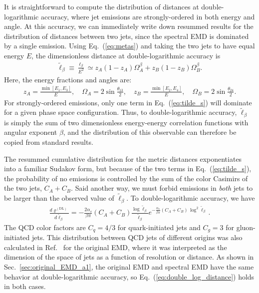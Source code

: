 \documentclass[letterpaper,11pt]{article}
\DeclareRobustCommand{\Sec}[1]{Sec.~\ref{#1}}
\DeclareRobustCommand{\Eq}[1]{Eq.~(\ref{#1})}
\DeclareRobustCommand{\InRef}[1]{Ref.~\cite{#1}}
\begin{document}
It is straightforward to compute the distribution of distances at double-logarithmic accuracy, where jet emissions are strongly-ordered in both energy and angle.
%
At this accuracy, we can immediately write down resummed results for the distribution of distances between two jets, since the spectral EMD is dominated by a single emission.
%
Using \Eq{eq:metas} and taking the two jets to have equal energy $E$, the dimensionless distance at double-logarithmic accuracy is
%
\begin{align}
\label{eq:tilde_s}
\tilde \ell_\beta \equiv \frac{\ell_\beta}{E^2} \simeq z_A (1-z_A) \Omega_{A}^\beta + z_B (1-z_B) \Omega_{B}^\beta.
\end{align}
%
Here, the energy fractions and angles are:
%
\begin{align}
z_A = \frac{\min[E_1,E_3]}{E}, \quad \Omega_A = 2 \sin \frac{\theta_{13}}{2}, \quad z_B= \frac{\min[E_2,E_4]}{E}, \quad \Omega_B = 2 \sin \frac{\theta_{24}}{2}.
\end{align}
%
For strongly-ordered emissions, only one term in \Eq{eq:tilde_s} will dominate for a given phase space configuration.
%
Thus, to double-logarithmic accuracy, $\tilde \ell_\beta$ is simply the sum of two dimensionless energy-energy correlation functions with angular exponent $\beta$, and the distribution of this observable can therefore be copied from standard results.



The resummed cumulative distribution for the metric distances exponentiates into a familiar Sudakov form, but because of the two terms in \Eq{eq:tilde_s}, the probability of no emissions is controlled by the sum of the color Casimirs of the two jets, $C_A+C_B$.
%
Said another way, we must forbid emissions in \emph{both} jets to be larger than the observed value of $\tilde \ell_\beta$.
%
To double-logarithmic accuracy, we have
%
\begin{align}
\label{eq:double_log_distance}
\frac{d\varrho^{(\text{DL})}}{d\tilde \ell_\beta}= -\frac{2\alpha_s}{\beta\pi}(C_A+C_B)\frac{\log\tilde \ell_\beta}{\tilde \ell_\beta} e^{
-\frac{\alpha_s}{\beta\pi}(C_A+C_B)\,\log^2\tilde \ell_\beta}
\,.
\end{align}
%
The QCD color factors are $C_q=4/3$ for quark-initiated jets and $C_g = 3$ for gluon-initiated jets.  
%
This distribution between QCD jets of different origins was also calculated in \InRef{Komiske:2022vxg} for the original EMD, where it was interpreted as the dimension of the space of jets as a function of resolution or distance.
%
As shown in \Sec{sec:original_EMD_a1}, the original EMD and spectral EMD have the same behavior at double-logarithmic accuracy, so \Eq{eq:double_log_distance} holds in both cases.
\end{document}
